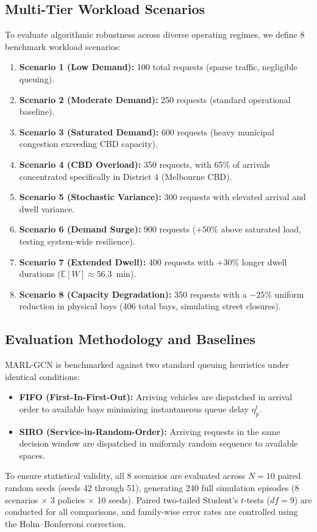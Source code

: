 \documentclass[journal]{IEEEtran}
\begin{document}
\subsection{Multi-Tier Workload Scenarios}
To evaluate algorithmic robustness across diverse operating regimes, we define 8 benchmark workload scenarios:
\begin{enumerate}
    \item \textbf{Scenario 1 (Low Demand):} 100 total requests (sparse traffic, negligible queuing).
    \item \textbf{Scenario 2 (Moderate Demand):} 250 requests (standard operational baseline).
    \item \textbf{Scenario 3 (Saturated Demand):} 600 requests (heavy municipal congestion exceeding CBD capacity).
    \item \textbf{Scenario 4 (CBD Overload):} 350 requests, with 65\% of arrivals concentrated specifically in District 4 (Melbourne CBD).
    \item \textbf{Scenario 5 (Stochastic Variance):} 300 requests with elevated arrival and dwell variance.
    \item \textbf{Scenario 6 (Demand Surge):} 900 requests ($+50\%$ above saturated load, testing system-wide resilience).
    \item \textbf{Scenario 7 (Extended Dwell):} 400 requests with $+30\%$ longer dwell durations ($\mathbb{E}[W] \approx 56.3$~min).
    \item \textbf{Scenario 8 (Capacity Degradation):} 350 requests with a $-25\%$ uniform reduction in physical bays (406 total bays, simulating street closures).
\end{enumerate}

\subsection{Evaluation Methodology and Baselines}
MARL-GCN is benchmarked against two standard queuing heuristics under identical conditions:
\begin{itemize}
    \item \textbf{FIFO (First-In-First-Out):} Arriving vehicles are dispatched in arrival order to available bays minimizing instantaneous queue delay $\eta_p^t$.
    \item \textbf{SIRO (Service-in-Random-Order):} Arriving requests in the same decision window are dispatched in uniformly random sequence to available spaces.
\end{itemize}
To ensure statistical validity, all 8 scenarios are evaluated across $N=10$ paired random seeds (seeds 42 through 51), generating 240 full simulation episodes (8 scenarios $\times$ 3 policies $\times$ 10 seeds). Paired two-tailed Student's $t$-tests ($df=9$) are conducted for all comparisons, and family-wise error rates are controlled using the Holm--Bonferroni correction.
\end{document}
